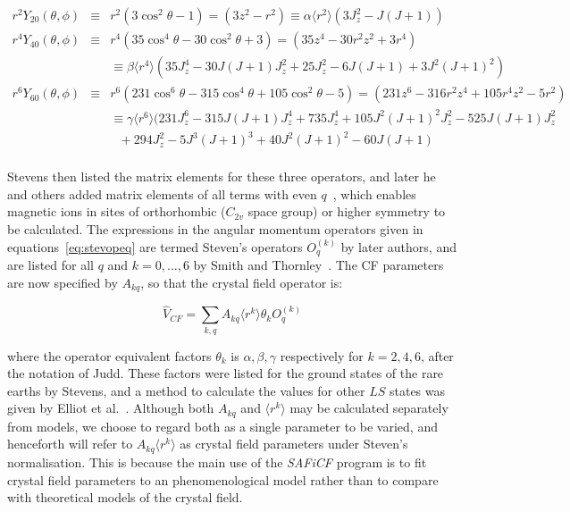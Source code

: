 \documentclass[12pt,onecolumn,tightenlines,aps,amsmath,floatfix,notitlepage,nofootinbib]{revtex4}
\begin{document}
\begin{eqnarray} \label{eq:stevopeq} \nonumber
r^2 Y_{20}(\theta,\phi) &\equiv& r^2 (3\cos^2\theta-1) = (3z^2 - r^2) \equiv \alpha \langle r^2 \rangle (3J_z^2 - J(J+1)) \\
r^4 Y_{40}(\theta,\phi) &\equiv& r^4 (35\cos^4\theta-30\cos^2\theta+3) = (35z^4-30r^2z^2+3r^4) \\ \nonumber 
&& \equiv \beta \langle r^4 \rangle (35J_z^4-30J(J+1)J_z^2+25J_z^2-6J(J+1)+3J^2(J+1)^2) \\ \nonumber
r^6 Y_{60}(\theta,\phi) &\equiv& r^6 (231\cos^6\theta-315\cos^4\theta+105\cos^2\theta-5) = (231z^6-316r^2z^4+105r^4z^2-5r^2) \\ \nonumber
&& \equiv \gamma \langle r^6 \rangle (231J_z^6-315J(J+1)J_z^4+735J_z^4+105J^2(J+1)^2J_z^2-525J(J+1)J_z^2 \\ \nonumber 
&& ~~~+294J_z^2-5J^3(J+1)^3+40J^2(J+1)^2-60J(J+1) \\ \nonumber
\end{eqnarray}

Stevens then listed the matrix elements for these three operators, and later he and others added matrix elements of all terms with even $q$~\cite{jones59}, which enables magnetic ions in sites of orthorhombic ($C_{2v}$ space group) or higher symmetry to be calculated. The expressions in the angular momentum operators given in equations~\ref{eq:stevopeq} are termed Steven's operators $O_q^{(k)}$ by later authors, and are listed for all $q$ and $k=0,\ldots,6$ by Smith and Thornley~\cite{ST66}. The CF parameters are now specified by $A_{kq}$, so that the crystal field operator is:

\begin{equation} \label{eq:stevCF}
\hat{V}_{CF} = \sum_{k,q} A_{kq} \langle r^k \rangle \theta_k O_q^{(k)}
\end{equation}

\noindent where the operator equivalent factors $\theta_k$ is $\alpha, \beta, \gamma$ respectively for $k=2,4,6$, after the notation of Judd. These factors were listed for the ground states of the rare earths by Stevens, and a method to calculate the values for other $LS$ states was given by Elliot et al.~\cite{elliot57}. Although both $A_{kq}$ and $\langle r^k \rangle$ may be calculated separately from models, we choose to regard both as a single parameter to be varied, and henceforth will refer to $A_{kq}\langle r^k \rangle$ as crystal field parameters under Steven's normalisation. This is because the main use of the \emph{SAFiCF} program is to fit crystal field parameters to an phenomenological model rather than to compare with theoretical models of the crystal field.
\end{document}
